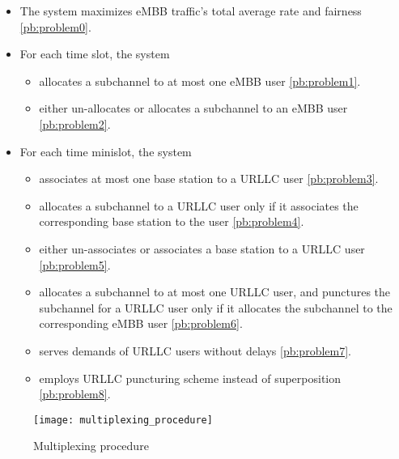 \begin{frame}
  \begin{itemize}
    \item The system maximizes eMBB traffic's total average rate and fairness \eqref{pb:problem0}.
    \item For each time slot, the system
      \begin{itemize}
        \item allocates a subchannel to at most one eMBB user \eqref{pb:problem1}.
        \item either un-allocates or allocates a subchannel to an eMBB user \eqref{pb:problem2}.
      \end{itemize}
  \end{itemize}
\end{frame}

\begin{frame}
  \begin{itemize}
    \item For each time minislot, the system
      \begin{itemize}
        \item associates at most one base station to a URLLC user \eqref{pb:problem3}.
        \item allocates a subchannel to a URLLC user only if it associates the corresponding base station to the user \eqref{pb:problem4}.
        \item either un-associates or associates a base station to a URLLC user \eqref{pb:problem5}.
        \item allocates a subchannel to at most one URLLC user, and punctures the subchannel for a URLLC user only if it allocates the subchannel to the corresponding eMBB user \eqref{pb:problem6}\proofFootnote.
        \item serves demands of URLLC users without delays \eqref{pb:problem7}.
        \item employs URLLC puncturing scheme instead of superposition \eqref{pb:problem8}.
      \end{itemize}
  \end{itemize}
\end{frame}

\begin{frame}
  \begin{figure}
    \texttt{[image: multiplexing\_procedure]}
    \caption{Multiplexing procedure}
  \end{figure}
\end{frame}

